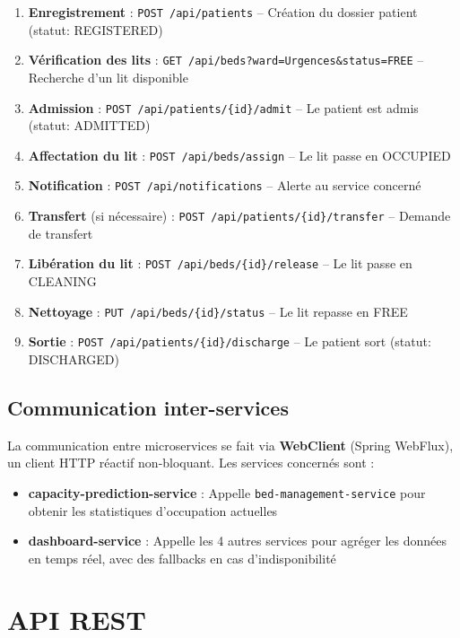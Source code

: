 \documentclass[12pt,a4paper]{report}
\begin{document}
\begin{enumerate}
    \item \textbf{Enregistrement} : \texttt{POST /api/patients} -- Cr\'eation du dossier patient (statut: REGISTERED)
    \item \textbf{V\'erification des lits} : \texttt{GET /api/beds?ward=Urgences\&status=FREE} -- Recherche d'un lit disponible
    \item \textbf{Admission} : \texttt{POST /api/patients/\{id\}/admit} -- Le patient est admis (statut: ADMITTED)
    \item \textbf{Affectation du lit} : \texttt{POST /api/beds/assign} -- Le lit passe en OCCUPIED
    \item \textbf{Notification} : \texttt{POST /api/notifications} -- Alerte au service concern\'e
    \item \textbf{Transfert} (si n\'ecessaire) : \texttt{POST /api/patients/\{id\}/transfer} -- Demande de transfert
    \item \textbf{Lib\'eration du lit} : \texttt{POST /api/beds/\{id\}/release} -- Le lit passe en CLEANING
    \item \textbf{Nettoyage} : \texttt{PUT /api/beds/\{id\}/status} -- Le lit repasse en FREE
    \item \textbf{Sortie} : \texttt{POST /api/patients/\{id\}/discharge} -- Le patient sort (statut: DISCHARGED)
\end{enumerate}

\section{Communication inter-services}

La communication entre microservices se fait via \textbf{WebClient} (Spring WebFlux), un client HTTP r\'eactif non-bloquant. Les services concern\'es sont :

\begin{itemize}
    \item \textbf{capacity-prediction-service} : Appelle \texttt{bed-management-service} pour obtenir les statistiques d'occupation actuelles
    \item \textbf{dashboard-service} : Appelle les 4 autres services pour agr\'eger les donn\'ees en temps r\'eel, avec des fallbacks en cas d'indisponibilit\'e
\end{itemize}

\chapter{API REST}
\end{document}
